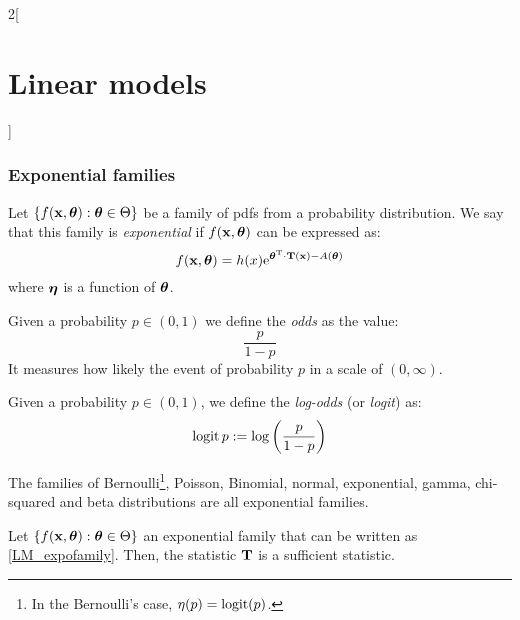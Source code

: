 \documentclass[../../../main_math.tex]{subfiles}
\begin{document}
\begin{multicols}{2}[\section{Linear models}]
  \subsubsection{Exponential families}
  \begin{definition}
    Let $\{f(\boldsymbol{\mathrm{x}},\boldsymbol{\mathrm{\theta}}):\boldsymbol{\mathrm{\theta}}\in\Theta\}$ be a family of pdfs from a probability distribution. We say that this family is \emph{exponential} if $f(\boldsymbol{\mathrm{x}},\boldsymbol{\mathrm{\theta}})$ can be expressed as:
    \begin{equation}\label{LM_expofamily}
      f(\boldsymbol{\mathrm{x}},\boldsymbol{\mathrm{\theta}})=h(x)\mathrm{e}^{{\boldsymbol{\mathrm{\theta}}}^{\mathrm{T}}\cdot \boldsymbol{\mathrm{T}}(\boldsymbol{\mathrm{x}})-A(\boldsymbol{\mathrm{\theta}})}
    \end{equation}
    where $\boldsymbol{\mathrm{\eta}}$ is a function of $\boldsymbol{\mathrm{\theta}}$.
  \end{definition}
  \begin{definition}
    Given a probability $p\in(0,1)$ we define the \emph{odds} as the value: $$\frac{p}{1-p}$$ It measures how likely the event of probability $p$ in a scale of $(0,\infty)$.
  \end{definition}
  \begin{definition}
    Given a probability $p\in(0,1)$, we define the \emph{log-odds} (or \emph{logit}) as: $$\operatorname{logit} p:=\log\left(\frac{p}{1-p}\right)$$
  \end{definition}
  \begin{proposition}
    The families of Bernoulli\footnote{In the Bernoulli's case, $\eta(p)=\operatorname{logit}(p)$.}, Poisson, Binomial, normal, exponential, gamma, chi-squared and beta distributions are all exponential families.
  \end{proposition}
  \begin{theorem}
    Let $\{f(\boldsymbol{\mathrm{x}},\boldsymbol{\mathrm{\theta}}):\boldsymbol{\mathrm{\theta}}\in\Theta\}$  an exponential family that can be written as \cref{LM_expofamily}. Then, the statistic $\boldsymbol{\mathrm{T}}$ is a sufficient statistic.
  \end{theorem}
\end{multicols}
\end{document}
